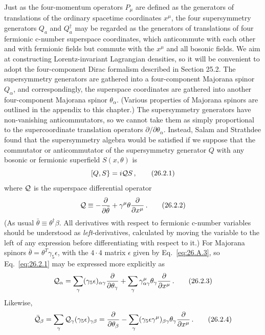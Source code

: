 Just as the four-momentum operators $P_\mu$ are defined as the generators of
translations of the ordinary spacetime coordinates $x^\mu$, the four
supersymmetry generators $Q_a$ and $Q_a^\dagger$ may be regarded as the
generators of translations of four fermionic c-number superspace coordinates,
which anticommute with each other and with fermionic fields but commute with
the $x^\mu$ and all bosonic fields. We aim at constructing Lorentz-invariant
Lagrangian densities, so it will be convenient to adopt the four-component
Dirac formalism described in Section 25.2. The supersymmetry generators are
gathered into a four-component Majorana spinor $Q_\alpha$, and
correspondingly, the superspace coordinates are gathered into another
four-component Majorana spinor $\theta_\alpha$. (Various properties of
Majorana spinors are outlined in the appendix to this chapter.) The
supersymmetry generators have non-vanishing anticommutators, so we cannot take
them as simply proportional to the supercoordinate translation operators
$\partial/\partial\theta_\alpha$. Instead, Salam and Strathdee found that the
supersymmetry algebra would be satisfied if we suppose that the commutator or
anticommutator of the supersymmetry generator $Q$ with any bosonic or
fermionic superfield $S(x,\theta)$ is
\begin{equation}
  \left[Q,S\right\}=i\mathcal{Q} S\,,
  \tag{26.2.1}\label{eq:26.2.1}
\end{equation}
where $\mathcal{Q}$ is the superspace differential operator
\begin{equation}
  \mathcal{Q}\equiv
  -\frac{\partial}{\partial\bar\theta}
  +\gamma^\mu\theta\frac{\partial}{\partial x^\mu}\,.
  \tag{26.2.2}\label{eq:26.2.2}
\end{equation}
(As usual $\bar\theta\equiv\theta^\dagger\beta$. All derivatives with respect
to fermionic c-number variables should be understood as
\emph{left}-derivatives, calculated by moving the variable to the left of any
expression before differentiating with respect to it.) For Majorana spinors
$\bar\theta=\theta^T\gamma_5\epsilon$, with the $4\cdot4$ matrix $\epsilon$
given by Eq.~\eqref{eq:26.A.3}, so Eq.~\eqref{eq:26.2.1} may be expressed more
explicitly as
\begin{equation}
  \mathcal{Q}_\alpha
  =\sum_\gamma(\gamma_5\epsilon)_{\alpha\gamma}
    \frac{\partial}{\partial\theta_\gamma}
  +\sum_\gamma\gamma^\mu_{\alpha\gamma}\theta_\gamma
    \frac{\partial}{\partial x^\mu}\,.
  \tag{26.2.3}\label{eq:26.2.3}
\end{equation}
Likewise,
\begin{equation}
  \bar{\mathcal{Q}}_\beta
  =\sum_\gamma\mathcal{Q}_\gamma(\gamma_5\epsilon)_{\gamma\beta}
  =\frac{\partial}{\partial\theta_\beta}
  -\sum_\gamma(\gamma_5\epsilon\gamma^\mu)_{\beta\gamma}\theta_\gamma
    \frac{\partial}{\partial x^\mu}\,.
  \tag{26.2.4}\label{eq:26.2.4}
\end{equation}
